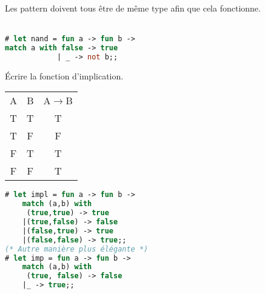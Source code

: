 \documentclass[12pt,a4paper,openany]{book}
\begin{document}
	\begin{remarque}
		Les pattern doivent tous être de même type afin que cela fonctionne.\\~
	\end{remarque}
\begin{exemple}
	\begin{lstlisting}[language=Caml, caption=Exemple filtrage, numbers=none, framerule=0pt]
# let nand = fun a -> fun b -> 
match a with false -> true
			| _ -> not b;;

\end{lstlisting}
Écrire la fonction d'implication.
\begin{tabular}{c|c||c}
	A&B&A$\rightarrow$B\\
	T&T&T\\
	T&F&F\\
	F&T&T\\
	F&F&T\\
\end{tabular}
	\begin{lstlisting}[language=Caml, caption=Exemple filtrage -- Implication, numbers=none, framerule=0pt]
# let impl = fun a -> fun b -> 
	match (a,b) with 
	 (true,true) -> true
	|(true,false) -> false
	|(false,true) -> true
	|(false,false) -> true;;
(* Autre manière plus élégante *)
# let imp = fun a -> fun b -> 
	match (a,b) with
	 (true, false) -> false
	|_ -> true;;
\end{lstlisting}
\end{exemple}


\appendix
\lstlistoflistings
\end{document}
